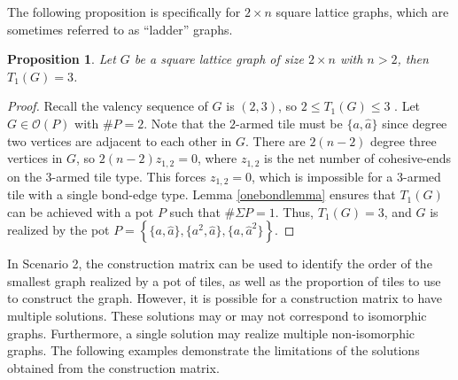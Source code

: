 \documentclass{elsarticle}
\newtheorem{proposition}[theorem]{Proposition}
\theoremstyle{definition}
\theoremstyle{remark}
\theoremstyle{plain}
\theoremstyle{plain}
\begin{document}
The following proposition is specifically for $2 \times n$ square lattice graphs, which are sometimes referred to as ``ladder'' graphs.
\begin{proposition} Let $G$ be a square lattice graph of size $2 \times n$ with $n>2$, then $T_1(G)=3$. \end{proposition} 
\begin{proof}
Recall the valency sequence of $G$ is $(2,3)$, so $2 \leq T_1(G) \leq 3$ \cite{ellis2014minimal}.  Let $G \in \mathcal{O}(P)$ with $\#P = 2$. Note that the  $2$-armed tile must be $\{a,\hat{a}\}$ since degree two vertices are adjacent to each other in $G$. There are $2(n-2)$ degree three vertices in $G$, so $2(n-2)z_{1,2}=0$, where $z_{1,2}$ is the net number of cohesive-ends on the 3-armed tile type. This forces $z_{1,2}=0$, which is impossible for a 3-armed tile with a single bond-edge type. Lemma \ref{onebondlemma} ensures that $T_1(G)$ can be achieved with a pot $P$ such that $\# \Sigma P = 1$. Thus, $T_1(G) = 3$, and $G$ is realized by the pot $P = \left\{ \{ a, \hat{a} \}, \{ a^2, \hat{a} \}, \{a, \hat{a}^2\} \right\}.$
\end{proof} 

In Scenario 2, the construction matrix can be used to identify the order of the smallest graph realized by a pot of tiles, as well as the proportion of tiles to use to construct the graph. However, it is possible for a construction matrix to have multiple solutions. These solutions may or may not correspond to isomorphic graphs. Furthermore, a single solution may realize multiple non-isomorphic graphs. The following examples demonstrate the limitations of the solutions obtained from the construction matrix.
\end{document}

